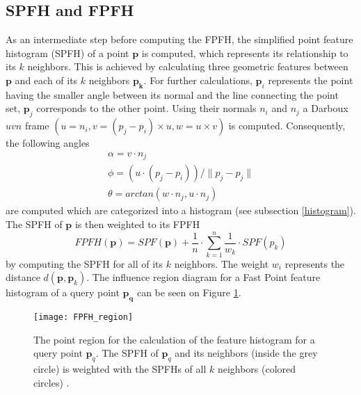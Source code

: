 \subsection{SPFH and FPFH}
As an intermediate step before computing the FPFH, the simplified point feature histogram (SPFH) of a point $\boldsymbol{p}$ is computed, which represents its relationship to its $k$ neighbors. This is achieved by calculating three geometric features between $\boldsymbol{p}$ and each of its $k$ neighbors $\boldsymbol{p_k}$. For further calculations, $\boldsymbol{p}_i$ represents the point having the smaller angle between its normal and the line connecting the point set, $\boldsymbol{p}_j$ corresponds to the other point. Using their normals $n_i$ and $n_j$ a Darboux $uvn$ frame $(u = n_i, v = (p_j - p_i) \times u, w = u \times v)$ is computed. Consequently, the following angles
\begin{equation}
\begin{split}
\alpha = v \cdot n_j
\\
\phi = (u \cdot (p_j - p_i))/\|p_j - p_j\|
\\
\theta = arctan(w \cdot n_j, u \cdot n_j)
\end{split}
\label{eq:AngularVariations}
\end{equation}
are computed which are categorized into a histogram (see subsection \ref{histogram}). The SPFH of $\boldsymbol{p}$ is then weighted to its FPFH
\begin{equation}
FPFH(\boldsymbol{p}) = SPF(\boldsymbol{p}) + \frac{1}{n} \cdot \displaystyle\sum_{k=1}^{n}\frac{1}{w_k} \cdot SPF(p_k)
\end{equation}
by computing the SPFH for all of its $k$ neighbors. The weight $w_i$ represents the distance $d(\boldsymbol{p},\boldsymbol{p}_k)$. The influence region diagram for a Fast Point feature histogram of a query point $\boldsymbol{p_q}$ can be seen on Figure \ref{fig:FPFHregion}. 
\begin{figure}[H]
	\centering
	\texttt{[image: FPFH\_region]}
	\caption{The point region for the calculation of the feature histogram for a query point $\boldsymbol{p}_q$. The SPFH of $\boldsymbol{p}_q$ and its neighbors (inside the grey circle) is weighted with the SPFHs of all $k$ neighbors (colored circles) \cite{FPFH}.}
	\label{fig:FPFHregion}
\end{figure}
